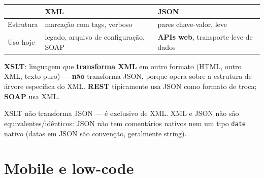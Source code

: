 \begin{conceito}
\begin{center}
\begin{tabular}{@{}p{2.6cm}p{4.6cm}p{4.6cm}@{}}
\toprule
& \textbf{XML} & \textbf{JSON} \\
\midrule
Estrutura & marcação com tags, verboso & pares chave-valor, leve \\
Uso hoje & legado, arquivo de configuração, SOAP & \textbf{APIs web},
transporte leve de dados \\
\bottomrule
\end{tabular}
\end{center}

\textbf{XSLT}: linguagem que \textbf{transforma XML} em outro formato
(HTML, outro XML, texto puro) --- \textbf{não} transforma JSON, porque
opera sobre a estrutura de árvore específica do XML. \textbf{REST}
tipicamente usa JSON como formato de troca; \textbf{SOAP} usa XML.
\end{conceito}

\begin{cuidado}
XSLT não transforma JSON --- é exclusivo de XML. XML e JSON não são
equivalentes/idênticos: JSON não tem comentários nativos nem um tipo
\texttt{date} nativo (datas em JSON são convenção, geralmente string).
\end{cuidado}

\section{Mobile e low-code}

